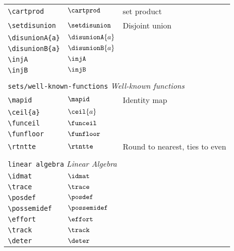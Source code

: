 \begin{longtable}{lll}
 \hline
{\color[rgb]{0.5,0.5,0.5}\texttt{\textbackslash cartprod}} & $\cartprod$ &  set product\\ 
 {\color[rgb]{0.5,0.5,0.5}\texttt{\textbackslash setdisunion}} & $\setdisunion$ &  Disjoint union\\ 
 {\color[rgb]{0.5,0.5,0.5}\texttt{\textbackslash disunionA\{a\}}} & $\disunionA{a}$ & \\ 
 {\color[rgb]{0.5,0.5,0.5}\texttt{\textbackslash disunionB\{a\}}} & $\disunionB{a}$ & \\ 
 {\color[rgb]{0.5,0.5,0.5}\texttt{\textbackslash injA}} & $\injA$ & \\ 
 {\color[rgb]{0.5,0.5,0.5}\texttt{\textbackslash injB}} & $\injB$ & \\ 
  &  & \\ 
 \multicolumn{3}{l}{{\color[rgb]{0.5,0.5,0.5}\texttt{sets/well-known-functions}} \emph{Well-known functions}}\\ 
 \hline
{\color[rgb]{0.5,0.5,0.5}\texttt{\textbackslash mapid}} & $\mapid$ &  Identity map\\ 
 {\color[rgb]{0.5,0.5,0.5}\texttt{\textbackslash ceil\{a\}}} & $\ceil{a}$ & \\ 
 {\color[rgb]{0.5,0.5,0.5}\texttt{\textbackslash funceil}} & $\funceil$ & \\ 
 {\color[rgb]{0.5,0.5,0.5}\texttt{\textbackslash funfloor}} & $\funfloor$ & \\ 
 {\color[rgb]{0.5,0.5,0.5}\texttt{\textbackslash rtntte}} & $\rtntte$ &  Round to nearest, ties to even\\ 
  &  & \\ 
 \multicolumn{3}{l}{{\color[rgb]{0.5,0.5,0.5}\texttt{linear algebra}} \emph{Linear Algebra}}\\ 
 \hline
\hline
{\color[rgb]{0.5,0.5,0.5}\texttt{\textbackslash idmat}} & $\idmat$ & \\ 
 {\color[rgb]{0.5,0.5,0.5}\texttt{\textbackslash trace}} & $\trace$ & \\ 
 {\color[rgb]{0.5,0.5,0.5}\texttt{\textbackslash posdef}} & $\posdef$ & \\ 
 {\color[rgb]{0.5,0.5,0.5}\texttt{\textbackslash possemidef}} & $\possemidef$ & \\ 
 {\color[rgb]{0.5,0.5,0.5}\texttt{\textbackslash effort}} & $\effort$ & \\ 
 {\color[rgb]{0.5,0.5,0.5}\texttt{\textbackslash track}} & $\track$ & \\ 
 {\color[rgb]{0.5,0.5,0.5}\texttt{\textbackslash deter}} & $\deter$ & \\ 

\end{longtable}

